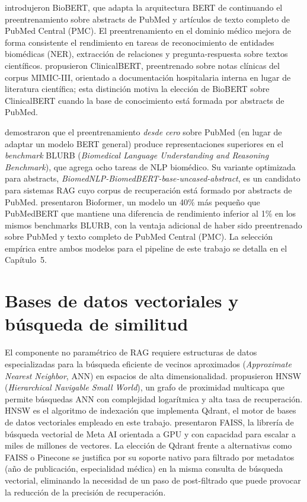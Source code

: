 \documentclass[11pt,a4paper,spanish]{book}
\numberwithin{equation}{chapter}
\numberwithin{figure}{chapter}
\begin{document}
 introdujeron BioBERT, que adapta la arquitectura BERT de  continuando el preentrenamiento sobre abstracts de PubMed y artículos de texto completo de PubMed Central (PMC). El preentrenamiento en el dominio médico mejora de forma consistente el rendimiento en tareas de reconocimiento de entidades biomédicas (NER), extracción de relaciones y pregunta-respuesta sobre textos científicos.  propusieron ClinicalBERT, preentrenado sobre notas clínicas del corpus MIMIC-III, orientado a documentación hospitalaria interna en lugar de literatura científica; esta distinción motiva la elección de BioBERT sobre ClinicalBERT cuando la base de conocimiento está formada por abstracts de PubMed.

 demostraron que el preentrenamiento \textit{desde cero} sobre PubMed (en lugar de adaptar un modelo BERT general) produce representaciones superiores en el \textit{benchmark} BLURB (\textit{Biomedical Language Understanding and Reasoning Benchmark}), que agrega ocho tareas de NLP biomédico. Su variante optimizada para abstracts, \textit{BiomedNLP-BiomedBERT-base-uncased-abstract}, es un candidato para sistemas RAG cuyo corpus de recuperación está formado por abstracts de PubMed.  presentaron Bioformer, un modelo un 40\% más pequeño que PubMedBERT que mantiene una diferencia de rendimiento inferior al 1\% en los mismos benchmarks BLURB, con la ventaja adicional de haber sido preentrenado sobre PubMed y texto completo de PubMed Central (PMC). La selección empírica entre ambos modelos para el pipeline de este trabajo se detalla en el Capítulo~5.

\section{Bases de datos vectoriales y búsqueda de similitud}

El componente no paramétrico de RAG requiere estructuras de datos especializadas para la búsqueda eficiente de vecinos aproximados (\textit{Approximate Nearest Neighbor}, ANN) en espacios de alta dimensionalidad.  propusieron HNSW (\textit{Hierarchical Navigable Small World}), un grafo de proximidad multicapa que permite búsquedas ANN con complejidad logarítmica y alta tasa de recuperación. HNSW es el algoritmo de indexación que implementa Qdrant, el motor de bases de datos vectoriales empleado en este trabajo.  presentaron FAISS, la librería de búsqueda vectorial de Meta AI orientada a GPU y con capacidad para escalar a miles de millones de vectores. La elección de Qdrant frente a alternativas como FAISS o Pinecone se justifica por su soporte nativo para filtrado por metadatos (año de publicación, especialidad médica) en la misma consulta de búsqueda vectorial, eliminando la necesidad de un paso de post-filtrado que puede provocar la reducción de la precisión de recuperación.
\end{document}
